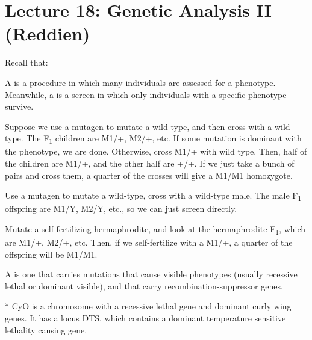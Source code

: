 \section*{Lecture 18: Genetic Analysis II (Reddien)}
\setcounter{section}{18}

Recall that:

\begin{defn}
	A  is a procedure in which many individuals are assessed for a phenotype. 
	Meanwhile, a  is a screen in which only individuals with a specific phenotype survive.
\end{defn}	

\begin{exper}
	Suppose we use a mutagen to mutate a wild-type, and then cross with a wild type. The F\textsubscript1 children are M1/+, M2/+, etc. If some mutation is dominant with the phenotype, we are done.
	Otherwise, cross M1/+ with wild type. Then, half of the children are M1/+, and the other half are +/+. If we just take a bunch of pairs and cross them, a quarter of the crosses will give a M1/M1 homozygote.
\end{exper}

\begin{exper}
	Use a mutagen to mutate a wild-type, cross with a wild-type male. The male F\textsubscript1 offspring are M1/Y, M2/Y, etc., so we can just screen directly.
\end{exper}

\begin{exper}
	Mutate a self-fertilizing hermaphrodite, and look at the hermaphrodite F\textsubscript1, which are M1/+, M2/+, etc. 
	Then, if we self-fertilize with a M1/+, a quarter of the offspring will be M1/M1.
\end{exper}

\begin{defn}
	A  is one that carries mutations that cause visible phenotypes (usually recessive lethal or dominant visible), and that carry recombination-suppressor genes.
\end{defn}	

\begin{exm}*
	CyO is a chromosome with a recessive lethal gene and dominant curly wing genes. It has a locus DTS, which contains a dominant temperature sensitive lethality causing gene.
\end{exm}

